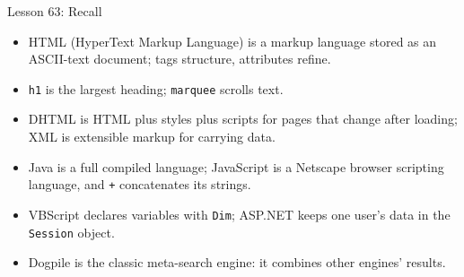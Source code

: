 \documentclass[aspectratio=169]{beamer}
\begin{document}
\begin{frame}{Lesson 63: Recall}
  \begin{itemize}
    \item HTML (HyperText Markup Language) is a markup language stored as an
      ASCII-text document; tags structure, attributes refine.
    \item \texttt{h1} is the largest heading; \texttt{marquee} scrolls text.
    \item DHTML is HTML plus styles plus scripts for pages that change after
      loading; XML is extensible markup for carrying data.
    \item Java is a full compiled language; JavaScript is a Netscape browser
      scripting language, and \texttt{+} concatenates its strings.
    \item VBScript declares variables with \texttt{Dim}; ASP.NET keeps one
      user's data in the \texttt{Session} object.
    \item Dogpile is the classic meta-search engine: it combines other
      engines' results.
  \end{itemize}
\end{frame}
\end{document}
